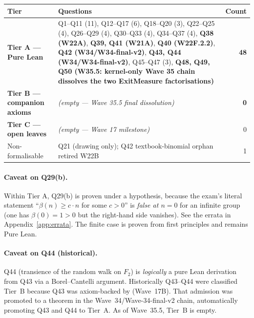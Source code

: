 \documentclass[11pt,a4paper]{article}
\theoremstyle{plain}
\theoremstyle{definition}
\begin{document}
\begin{center}
\renewcommand{\arraystretch}{1.15}
\small
\begin{tabular}{p{3.2cm}p{5.8cm}r}
\toprule
\textbf{Tier} & \textbf{Questions} & \textbf{Count} \\
\midrule
\textbf{Tier A --- Pure Lean}
  & Q1--Q11 (11), Q12--Q17 (6), Q18--Q20 (3), Q22--Q25 (4),
    Q26--Q29 (4), Q30--Q33 (4), Q34--Q37 (4), \textbf{Q38 (W22A)},
    \textbf{Q39, Q41 (W21A)}, \textbf{Q40 (W22F.2.2)},
    \textbf{Q42 (W34/W34-final-v2)}, \textbf{Q43, Q44 (W34/W34-final-v2)},
    Q45--Q47 (3),
    \textbf{Q48, Q49, Q50 (W35.5: kernel-only Wave 35 chain dissolves
    the two ExitMeasure factorisations)}
  & \textbf{48} \\
\midrule
\textbf{Tier B --- companion axioms}
  & \emph{(empty --- Wave 35.5 final dissolution)}
  & \textbf{0} \\
\midrule
\textbf{Tier C --- open leaves}
  & \emph{(empty --- Wave 17 milestone)}
  & 0 \\
\midrule
Non-formalisable & Q21 (drawing only); Q42 textbook-binomial orphan retired W22B & 1 \\
\bottomrule
\end{tabular}
\end{center}

\paragraph{Caveat on Q29(b).}
Within Tier A, Q29(b) is proven under a \lean{[Finite G]} hypothesis,
because the exam's literal statement
``$\beta(n) \geq c \cdot n$ for some $c > 0$''
is \emph{false at $n = 0$} for an infinite group (one has
$\beta(0) = 1 > 0$ but the right-hand side vanishes). See the errata
in Appendix~\ref{app:errata}. The finite case is proven from first
principles and remains Pure Lean.

\paragraph{Caveat on Q44 (historical).}
Q44 (transience of the random walk on $F_2$) is \emph{logically} a
pure Lean derivation from Q43 via a Borel--Cantelli argument.
Historically Q43--Q44 were classified Tier~B because Q43 was
axiom-backed by  (Wave~17B). That
admission was promoted to a theorem in the Wave~34/Wave-34-final-v2
chain, automatically promoting Q43 and Q44 to Tier~A. As of
Wave~35.5, Tier~B is empty.
\end{document}

